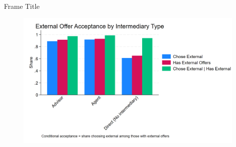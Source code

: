 \documentclass[10pt,aspectratio=169]{beamer}
\begin{document}
 
\begin{frame}{Frame Title}

\begin{figure}
     \centering
     \includegraphics[width=0.6\linewidth]{figures//IE4/IE4_external_acceptance_by_intermediary.png}
     \label{fig:placeholder}
 \end{figure}
\end{frame}
 
\end{document}
